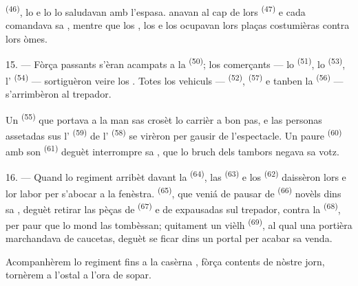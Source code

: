  \textsuperscript{(46)}, lo 
e lo  lo saludavan amb l'espasa. 
anavan al cap de lors  \textsuperscript{(47)} e cada
 comandava sa , mentre que los
, los  e los  ocupavan lors
plaças costumièras contra lors òmes.

15. --- Fòrça passants s'èran acampats a la 
\textsuperscript{(50)}; los comerçants --- lo 
\textsuperscript{(51)}, lo  \textsuperscript{(53)},
l' \textsuperscript{(54)} --- sortiguèron veire los
. Totes los vehiculs --- 
\textsuperscript{(52)},  \textsuperscript{(57)} e
tanben la  \textsuperscript{(56)} --- s'arrimbèron al
trepador.

\VUsaut{3.0mm}

Un  \textsuperscript{(55)} que portava a la man sas
 crosèt lo carrièr a bon pas, e las personas
assetadas sus l' \textsuperscript{(59)} de l'
\textsuperscript{(58)} se virèron per gausir de l'espectacle. Un paure
 \textsuperscript{(60)} amb son 
\textsuperscript{(61)} deguèt interrompre sa , que lo bruch dels
tambors negava sa votz.

16. --- Quand lo regiment arribèt davant la 
\textsuperscript{(64)}, las  \textsuperscript{(63)} e los
 \textsuperscript{(62)} daissèron lors  e lor labor per s'abocar a la fenèstra. 
\textsuperscript{(65)}, que veniá de pausar de 
\textsuperscript{(66)} novèls dins sa , deguèt retirar las pèças
de  \textsuperscript{(67)} e de  expausadas sul
trepador, contra la  \textsuperscript{(68)}, per paur
que lo mond las tombèssan; quitament un vièlh 
\textsuperscript{(69)}, al qual una portièra marchandava de caucetas, deguèt se
ficar dins un portal per acabar sa venda.

Acompanhèrem lo regiment fins a la casèrna , fòrça contents de nòstre
jorn, tornèrem a l'ostal a l'ora de sopar.

